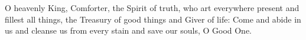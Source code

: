 O heavenly King, Comforter, the Spirit of truth,
who art everywhere present and fillest all things,
the Treasury of good things and Giver of life:
Come and abide in us and cleanse us from every stain and save our souls,
O Good One.